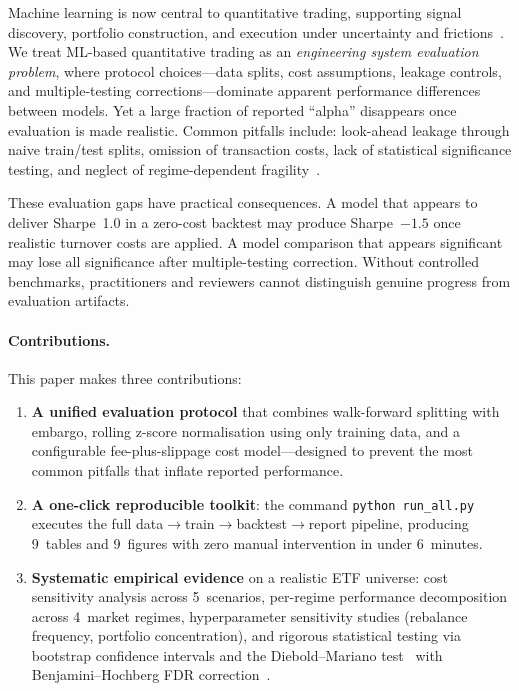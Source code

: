\documentclass[11pt]{article}
\begin{document}
Machine learning is now central to quantitative trading, supporting signal discovery, portfolio construction, and execution under uncertainty and frictions~\citep{ref7,ref13,ref8}.
We treat ML-based quantitative trading as an \emph{engineering system evaluation problem}, where protocol choices---data splits, cost assumptions, leakage controls, and multiple-testing corrections---dominate apparent performance differences between models.
Yet a large fraction of reported ``alpha'' disappears once evaluation is made realistic.
Common pitfalls include: look-ahead leakage through naive train/test splits, omission of transaction costs, lack of statistical significance testing, and neglect of regime-dependent fragility~\citep{ref41,ref42,ref5}.

These evaluation gaps have practical consequences.
A model that appears to deliver Sharpe~1.0 in a zero-cost backtest may produce Sharpe~$-1.5$ once realistic turnover costs are applied.
A model comparison that appears significant may lose all significance after multiple-testing correction.
Without controlled benchmarks, practitioners and reviewers cannot distinguish genuine progress from evaluation artifacts.

\paragraph{Contributions.}
This paper makes three contributions:

\begin{enumerate}[leftmargin=1.6em]
  \item \textbf{A unified evaluation protocol} that combines walk-forward splitting with embargo, rolling z-score normalisation using only training data, and a configurable fee-plus-slippage cost model---designed to prevent the most common pitfalls that inflate reported performance.

  \item \textbf{A one-click reproducible toolkit}: the command \texttt{python run\_all.py} executes the full data$\to$train$\to$backtest$\to$report pipeline, producing 9~tables and 9~figures with zero manual intervention in under 6~minutes.

  \item \textbf{Systematic empirical evidence} on a realistic ETF universe: cost sensitivity analysis across 5~scenarios, per-regime performance decomposition across 4~market regimes, hyperparameter sensitivity studies (rebalance frequency, portfolio concentration), and rigorous statistical testing via bootstrap confidence intervals and the Diebold--Mariano test~\citep{ref_dm} with Benjamini--Hochberg FDR correction~\citep{ref_bh}.
\end{enumerate}
\end{document}

